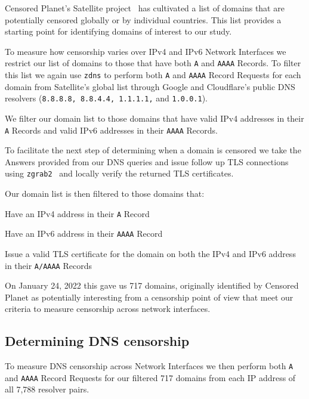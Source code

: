 Censored Planet's Satellite project~\cite{sundara2020censored} has cultivated a
list of domains that are potentially censored globally or by individual
countries. This list provides a starting point for identifying domains of
interest to our study.

To measure how censorship varies over IPv4 and IPv6 Network Interfaces we
restrict our list of domains to those that have both \texttt{A} and
\texttt{AAAA} Records. To filter this list we again use \texttt{zdns} to perform
both \texttt{A} and \texttt{AAAA} Record Requests for each domain from
Satellite's global list through Google and Cloudflare's public DNS resolvers
(\texttt{8.8.8.8, 8.8.4.4, 1.1.1.1,} and \texttt{1.0.0.1}).

We filter our domain list to those domains that have valid IPv4 addresses in
their \texttt{A} Records and valid IPv6 addresses in their \texttt{AAAA}
Records.

To facilitate the next step of determining when a domain is censored we take the
Answers provided from our DNS queries and issue follow up TLS connections using
\texttt{zgrab2}~\cite{Durumeric13zmap} and locally verify the returned TLS
certificates.

Our domain list is then filtered to those domains that:
\begin{packed_enumerate}
    \item Have an IPv4 address in their \texttt{A} Record
    \item Have an IPv6 address in their \texttt{AAAA} Record
    \item Issue a valid TLS certificate for the domain on both the IPv4 and IPv6
    address in their \texttt{A/AAAA} Records
\end{packed_enumerate}

On January 24, 2022 this gave us 717 domains, originally identified by Censored
Planet as potentially interesting from a censorship point of view that meet our
criteria to measure censorship across network interfaces.

\subsection{Determining DNS censorship}\label{sec:methodology:censorship}

To measure DNS censorship across Network Interfaces we then perform both
\texttt{A} and \texttt{AAAA} Record Requests for our filtered 717 domains from
each IP address of all 7,788 resolver pairs.

